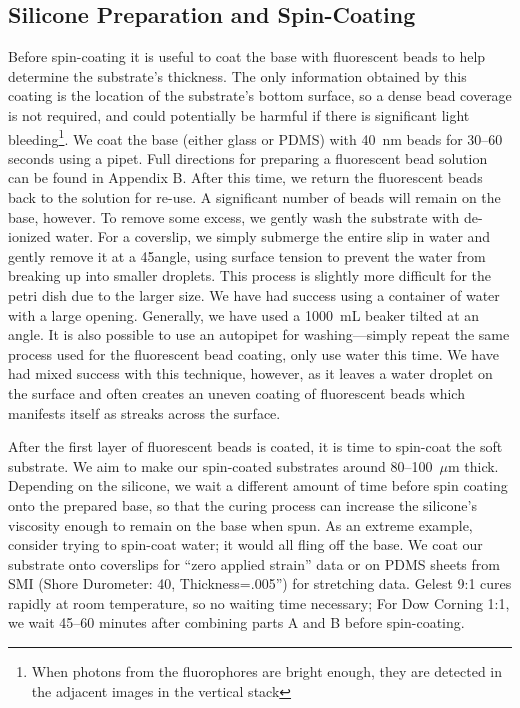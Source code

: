 \subsection{Silicone Preparation and Spin-Coating}
Before spin-coating it is useful to coat the base with fluorescent beads to help determine the substrate's thickness. The only information obtained by this coating is the location of the substrate's bottom surface, so a dense bead coverage is not required, and could potentially be harmful if there is significant light bleeding\footnote{When photons from the fluorophores are bright enough, they are detected in the adjacent images in the vertical stack}. We coat the base (either glass or PDMS) with 40~nm beads for 30--60 seconds using a pipet. Full directions for preparing a fluorescent bead solution can be found in Appendix B. After this time, we return the fluorescent beads back to the solution for re-use. A significant number of beads will remain on the base, however. To remove some excess, we gently wash the substrate with de-ionized water. For a coverslip, we simply submerge the entire slip in water and gently remove it at a 45\degree angle, using surface tension to prevent the water from breaking up into smaller droplets. This process is slightly more difficult for the petri dish due to the larger size. We have had success using a container of water with a large opening. Generally, we have used a 1000~mL beaker tilted at an angle. It is also possible to use an autopipet for washing---simply repeat the same process used for the fluorescent bead coating, only use water this time. We have had mixed success with this technique, however, as it leaves a water droplet on the surface and often creates an uneven coating of fluorescent beads which manifests itself as streaks across the surface.

After the first layer of fluorescent beads is coated, it is time to spin-coat the soft substrate. We aim to make our spin-coated substrates around  80--100~$\mu$m thick. Depending on the silicone, we wait a different amount of time before spin coating onto the prepared base, so that the curing process can increase the silicone's viscosity enough to remain on the base when spun. As an extreme example, consider trying to spin-coat water; it would all fling off the base. We coat our substrate onto coverslips for ``zero applied strain'' data or on PDMS sheets from SMI (Shore Durometer: 40, Thickness=.005'') for stretching data. Gelest 9:1 cures rapidly at room temperature, so no waiting time necessary; For Dow Corning 1:1, we wait 45--60 minutes after combining parts A and B before spin-coating.


